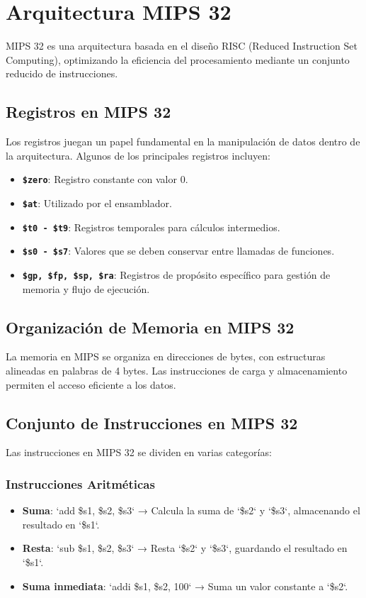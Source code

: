 \documentclass{article}
\begin{document}
\section{Arquitectura MIPS 32}
MIPS 32 es una arquitectura basada en el diseño RISC (Reduced Instruction Set Computing), optimizando la eficiencia del procesamiento mediante un conjunto reducido de instrucciones.

\subsection{Registros en MIPS 32}
Los registros juegan un papel fundamental en la manipulación de datos dentro de la arquitectura. Algunos de los principales registros incluyen:
\begin{itemize}
    \item \textbf{\texttt{\$zero}}: Registro constante con valor 0.
    \item \textbf{\texttt{\$at}}: Utilizado por el ensamblador.
    \item \textbf{\texttt{\$t0 - \$t9}}: Registros temporales para cálculos intermedios.
    \item \textbf{\texttt{\$s0 - \$s7}}: Valores que se deben conservar entre llamadas de funciones.
    \item \textbf{\texttt{\$gp, \$fp, \$sp, \$ra}}: Registros de propósito específico para gestión de memoria y flujo de ejecución.
\end{itemize}

\subsection{Organización de Memoria en MIPS 32}
La memoria en MIPS se organiza en direcciones de bytes, con estructuras alineadas en palabras de 4 bytes. Las instrucciones de carga y almacenamiento permiten el acceso eficiente a los datos.

\subsection{Conjunto de Instrucciones en MIPS 32}
Las instrucciones en MIPS 32 se dividen en varias categorías:

\subsubsection{Instrucciones Aritméticas}
\begin{itemize}
    \item \textbf{Suma}: `add \$s1, \$s2, \$s3` → Calcula la suma de `\$s2` y `\$s3`, almacenando el resultado en `\$s1`.
    \item \textbf{Resta}: `sub \$s1, \$s2, \$s3` → Resta `\$s2` y `\$s3`, guardando el resultado en `\$s1`.
    \item \textbf{Suma inmediata}: `addi \$s1, \$s2, 100` → Suma un valor constante a `\$s2`.
\end{itemize}
\end{document}
